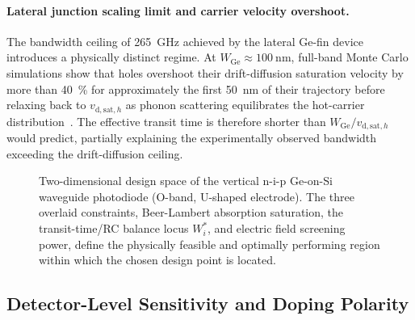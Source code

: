 \paragraph{Lateral junction scaling limit and carrier velocity overshoot.}
The bandwidth ceiling of \SI{265}{\giga\hertz} achieved by the lateral Ge-fin
device~\cite{Lischke2021} introduces a physically distinct regime. At
$W_{\mathrm{Ge}}\approx\SI{100}{\nano\metre}$, full-band Monte Carlo simulations
show that holes overshoot their drift-diffusion saturation velocity by more than
\SI{40}{\percent} for approximately the first \SI{50}{\nano\metre} of their
trajectory before relaxing back to $v_{\mathrm{d,sat},h}$ as phonon scattering
equilibrates the hot-carrier distribution~\cite{Alasio2024}. The effective
transit time is therefore shorter than $W_{\mathrm{Ge}}/v_{\mathrm{d,sat},h}$
would predict, partially explaining the experimentally observed bandwidth
exceeding the drift-diffusion ceiling.

\begin{figure}[H]
    \centering
    \caption{Two-dimensional design space of the vertical n-i-p Ge-on-Si
    waveguide photodiode (O-band, U-shaped electrode). The three overlaid
    constraints, Beer-Lambert absorption saturation, the transit-time/RC balance
    locus $W_i^*$, and electric field screening power, define the physically
    feasible and optimally performing region within which the chosen design
    point is located.}
    \label{fig:design_space_2d}
\end{figure}

\subsection[Detector Sensitivity]{Detector-Level Sensitivity and Doping Polarity}
\label{subsec:pd_sensitivity}

